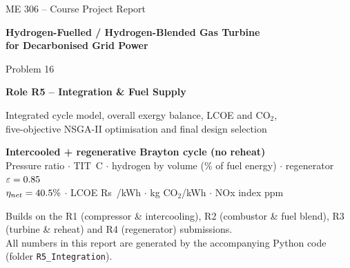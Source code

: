 \documentclass[10.5pt,a4paper]{article}
\newcommand{\Rs}{Rs~}
\begin{document}
\begin{titlepage}
\centering
{\large ME 306 -- Course Project Report\par}
\vspace{1.2cm}
{\LARGE\bfseries Hydrogen-Fuelled / Hydrogen-Blended Gas Turbine\\for Decarbonised Grid Power\par}
\vspace{0.6cm}
{\Large Problem 16\par}
\vspace{1.4cm}
{\Large\bfseries Role R5 -- Integration \& Fuel Supply\par}
\vspace{0.4cm}
{\large Integrated cycle model, overall exergy balance, LCOE and CO$_2$,\\ five-objective NSGA-II optimisation and final design selection\par}
\vspace{1.6cm}
\begin{tcolorbox}[colback=acc!6,colframe=acc,width=0.86\textwidth,title=\textbf{Recommended configuration}]
\centering
\textbf{Intercooled + regenerative Brayton cycle (no reheat)}\\[3pt]
Pressure ratio \finPR{} $\cdot$ TIT \finTITC\,\textdegree C $\cdot$ hydrogen \finX{} by volume (\finE\% of fuel energy) $\cdot$ regenerator $\varepsilon=0.85$\\[3pt]
$\eta_{net}=40.5\%$ $\cdot$ LCOE \Rs\finLCOE/kWh $\cdot$ \finCO{} kg CO$_2$/kWh $\cdot$ NOx index \finNOx{} ppm
\end{tcolorbox}
\vfill
{\small Builds on the R1 (compressor \& intercooling), R2 (combustor \& fuel blend), R3 (turbine \& reheat) and R4 (regenerator) submissions.\\
All numbers in this report are generated by the accompanying Python code (folder \texttt{R5\_Integration}).\par}
\end{titlepage}
\end{document}
